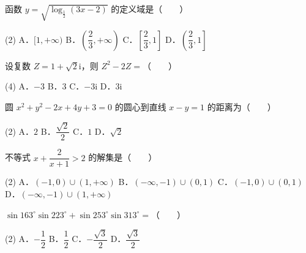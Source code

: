 

\begin{question}
函数 $y = \sqrt{\log_{\frac{1}{2}}(3x - 2)}$ 的定义域是\mbox{（　　）}

\begin{gkopts}(2)
\task A．$[1, +\infty)$
\task B．$\left(\dfrac{2}{3}, +\infty\right)$
\task C．$\left[\dfrac{2}{3}, 1\right]$
\task D．$\left(\dfrac{2}{3}, 1\right]$
\end{gkopts}

\end{question}
\begin{question}
设复数 $Z = 1 + \sqrt{2}\mathrm{i}$，则 $Z^2 - 2Z =$\mbox{（　　）}

\begin{gkopts}(4)
\task A．$-3$
\task B．$3$
\task C．$-3\mathrm{i}$
\task D．$3\mathrm{i}$
\end{gkopts}

\end{question}
\begin{question}
圆 $x^2 + y^2 - 2x + 4y + 3 = 0$ 的圆心到直线 $x - y = 1$ 的距离为\mbox{（　　）}

\begin{gkopts}(2)
\task A．$2$
\task B．$\dfrac{\sqrt{2}}{2}$
\task C．$1$
\task D．$\sqrt{2}$
\end{gkopts}

\end{question}
\begin{question}
不等式 $x + \dfrac{2}{x + 1} > 2$ 的解集是\mbox{（　　）}

\begin{gkopts}(2)
\task A．$(-1, 0) \cup (1, +\infty)$
\task B．$(-\infty, -1) \cup (0, 1)$
\task C．$(-1, 0) \cup (0, 1)$
\task D．$(-\infty, -1) \cup (1, +\infty)$
\end{gkopts}

\end{question}
\begin{question}
$\sin 163^\circ \sin 223^\circ + \sin 253^\circ \sin 313^\circ =$\mbox{（　　）}

\begin{gkopts}(2)
\task A．$-\dfrac{1}{2}$
\task B．$\dfrac{1}{2}$
\task C．$-\dfrac{\sqrt{3}}{2}$
\task D．$\dfrac{\sqrt{3}}{2}$
\end{gkopts}

\end{question}
